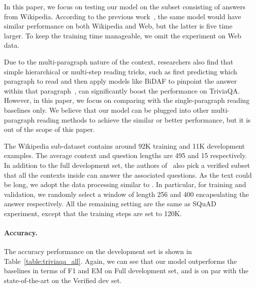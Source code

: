 \documentclass{article} \usepackage{iclr2018_conference,times}
\begin{document}
In this paper, we focus on testing our model on the subset consisting of answers from Wikipedia. According to the previous work~\citep{JoshiCWZ17,HuPQ17,PanLZCCH17}, the same model would have similar performance on both Wikipedia and Web, but the latter is five time larger. To keep the training time manageable, we omit the experiment on Web data. 

Due to the multi-paragraph nature of the context, researchers also find that simple hierarchical or multi-step reading tricks, such as first predicting which paragraph to read and then apply models like BiDAF to pinpoint the answer within that paragraph~\citep{ClarkG17}, can significantly boost the performance on TriviaQA. However, in this paper, we focus on comparing with the single-paragraph reading baselines only. We believe that our model can be plugged into other multi-paragraph reading methods to achieve the similar or better performance, but it is out of the scope of this paper.

The Wikipedia sub-dataset contains around 92K training and 11K development examples. The average context and question lengths are 495 and 15 respectively. In addition to the full development set, the authors of~\cite{JoshiCWZ17} also pick a verified subset that all the contexts inside can answer the associated questions.  As the text could be long, we adopt the data processing similar to \cite{HuPQ17,JoshiCWZ17}. In particular, for training and validation, we randomly select a window of length 256 and 400 encapsulating the answer respectively. All the remaining setting are the same as SQuAD experiment, except that the training steps are set to 120K.

\paragraph{Accuracy.} The accuracy performance on the development set is shown in Table~\ref{table:triviaqa_all}. Again, we can see that our model outperforms the baselines in terms of F1 and EM on Full development set, and is on par with the state-of-the-art on the Verified dev set. 

  
\end{document}
